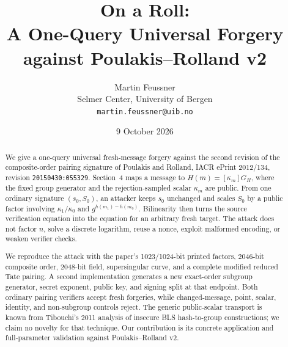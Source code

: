 \documentclass[10pt,a4paper]{article}
\title{\bfseries On a Roll:\\
\large A One-Query Universal Forgery against Poulakis--Rolland v2}
\author{Martin Feussner\\
\small Selmer Center, University of Bergen\\
\small \texttt{martin.feussner@uib.no}}
\date{9 October 2026}
\newcommand{\GH}{G_H}
\begin{document}
\maketitle

\begin{center}
\end{center}
\vspace{0.7em}

\begin{abstract}
We give a one-query universal fresh-message forgery against the second
revision of the composite-order pairing signature of Poulakis and Rolland,
IACR ePrint 2012/134, revision \texttt{20150430:055329}.  Section~4 maps a
message to $H(m)=[\kappa_m]\GH$, where the fixed group generator and the
rejection-sampled scalar $\kappa_m$ are public.  From one ordinary signature
$(s_0,S_0)$, an attacker keeps $s_0$ unchanged and scales $S_0$ by a public
factor involving $\kappa_1/\kappa_0$ and $g^{h(m_1)-h(m_0)}$.  Bilinearity then
turns the source verification equation into the equation for an arbitrary
fresh target.  The attack does not factor $n$, solve a discrete logarithm,
reuse a nonce, exploit malformed encoding, or weaken verifier checks.

We reproduce the attack with the paper's 1023/1024-bit printed factors,
2046-bit composite order, 2048-bit field, supersingular curve, and a complete
modified reduced Tate pairing.  A second implementation generates a new
exact-order subgroup generator, secret exponent, public key, and signing
split at that endpoint.  Both ordinary pairing verifiers accept fresh
forgeries, while changed-message, point, scalar, identity, and non-subgroup
controls reject.  The generic public-scalar transport is known from
Tibouchi's 2011 analysis of insecure BLS hash-to-group constructions; we claim
no novelty for that technique.  Our contribution is its concrete application
and full-parameter validation against Poulakis--Rolland v2.
\end{abstract}
\end{document}
